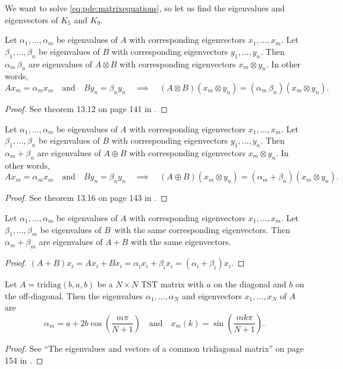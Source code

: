 We want to solve \cref{eq:pde:matrixequations}, so let us find the eigenvalues and eigenvectors of $K_5$ and $K_9$.
\newcommand{\kroeneckerlemmatext}[2]{
	Let $\alpha_1, \dots, \alpha_m$ be eigenvalues of $A$ with corresponding eigenvectors $x_1, \dots, x_m$.
	Let $\beta_1, \dots, \beta_n$ be eigenvalues of $B$ with corresponding eigenvectors $y_1, \dots, y_n$.
	Then $\alpha_m #2 \beta_n$ are eigenvalues of $A #1 B$ with corresponding eigenvectors $x_m \otimes y_n$.
	In other words,
	\begin{equation*}
		A x_m = \alpha_m x_m
		\quad \text{and} \quad
		B y_n = \beta_n y_n
		\quad \implies \quad
		(A #1 B) (x_m \otimes y_n) = (\alpha_m #2 \beta_n) (x_m \otimes y_n)
		.
	\end{equation*}
}

\begin{lemma}\label{pde:lemma:eigkronprod}
\kroeneckerlemmatext{\otimes}{\,}
\end{lemma}
\begin{proof}
See theorem 13.12 on page 141 in \cite{Laub_2004}.
\end{proof}
\begin{lemma}\label{pde:lemma:eigkronsum}
\kroeneckerlemmatext{\oplus}{+}
\end{lemma}
\begin{proof}
See theorem 13.16 on page 143 in \cite{Laub_2004}.
\end{proof}
\begin{lemma}\label{pde:lemma:eigsum}
Let $\alpha_1, \dots, \alpha_m$ be eigenvalues of $A$ with corresponding eigenvectors $x_1, \dots, x_m$.
Let $\beta_1, \dots, \beta_m$ be eigenvalues of $B$ with the same corresponding eigenvectors.
Then $\alpha_m + \beta_m$ are eigenvalues of $A+B$ with the same eigenvectors.
\end{lemma}
\begin{proof}
$ (A + B) x_i = A x_i + B x_i = \alpha_i x_i + \beta_i x_i = (\alpha_i + \beta_i) x_i.$
\end{proof}
\begin{lemma}\label{pde:lemma:eigtst}
Let $A = \text{tridiag}(b,a,b)$ be a $N \times N$ TST matrix with $a$ on the diagonal and $b$ on the off-diagonal.
Then the eigenvalues $\alpha_1, \dots, \alpha_N$ and eigenvectors $x_1, \dots, x_N$ of $A$ are
\begin{equation}
\alpha_m = a + 2b \cos \left( \frac{m\pi}{N+1} \right)
\quad \text{and} \quad
x_m(k) = \sin \left( \frac{mk\pi}{N+1} \right).
\label{eq:pde:eigtst}
\end{equation}
\end{lemma}
\begin{proof}
See ``The eigenvalues and vectors of a common tridiagonal matrix'' on page 154 in \cite{Smith}.
\end{proof}

